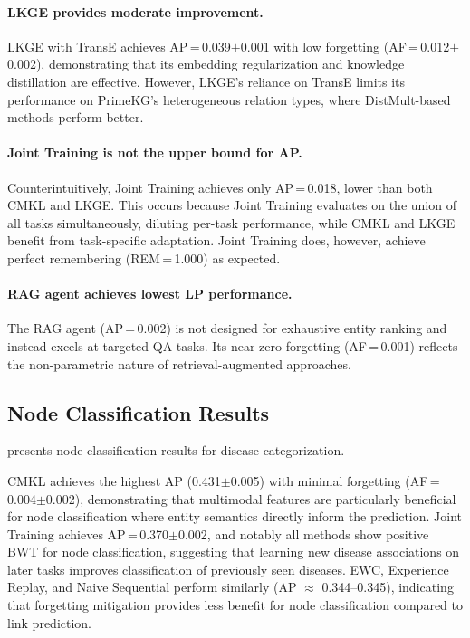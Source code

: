 \paragraph{LKGE provides moderate improvement.}
LKGE with TransE achieves AP\,=\,0.039$\pm$0.001 with low forgetting (AF\,=\,0.012$\pm$0.002), demonstrating that its embedding regularization and knowledge distillation are effective.
However, LKGE's reliance on TransE limits its performance on PrimeKG's heterogeneous relation types, where DistMult-based methods perform better.

\paragraph{Joint Training is not the upper bound for AP.}
Counterintuitively, Joint Training achieves only AP\,=\,0.018, lower than both CMKL and LKGE.
This occurs because Joint Training evaluates on the union of all tasks simultaneously, diluting per-task performance, while CMKL and LKGE benefit from task-specific adaptation.
Joint Training does, however, achieve perfect remembering (REM\,=\,1.000) as expected.

\paragraph{RAG agent achieves lowest LP performance.}
The RAG agent (AP\,=\,0.002) is not designed for exhaustive entity ranking and instead excels at targeted QA tasks.
Its near-zero forgetting (AF\,=\,0.001) reflects the non-parametric nature of retrieval-augmented approaches.

\subsection{Node Classification Results}
\label{sec:nc_results}

 presents node classification results for disease categorization.



CMKL achieves the highest AP (0.431$\pm$0.005) with minimal forgetting (AF\,=\,0.004$\pm$0.002), demonstrating that multimodal features are particularly beneficial for node classification where entity semantics directly inform the prediction.
Joint Training achieves AP\,=\,0.370$\pm$0.002, and notably all methods show positive BWT for node classification, suggesting that learning new disease associations on later tasks improves classification of previously seen diseases.
EWC, Experience Replay, and Naive Sequential perform similarly (AP $\approx$ 0.344--0.345), indicating that forgetting mitigation provides less benefit for node classification compared to link prediction.

